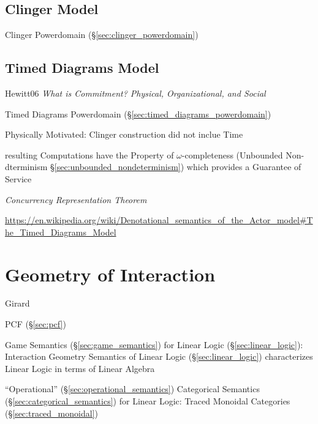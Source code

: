 \subsection{Clinger Model}\label{sec:clinger_model}

Clinger Powerdomain (\S\ref{sec:clinger_powerdomain})



\subsection{Timed Diagrams Model}\label{sec:timed_diagrams}

Hewitt06 \emph{What is Commitment? Physical, Organizational, and
  Social}

Timed Diagrams Powerdomain (\S\ref{sec:timed_diagrams_powerdomain})

Physically Motivated: Clinger construction did not inclue Time

resulting Computations have the Property of $\omega$-completeness
(Unbounded Non-dterminism \S\ref{sec:unbounded_nondeterminism}) which
provides a Guarantee of Service %


\emph{Concurrency Representation Theorem} %

\url{https://en.wikipedia.org/wiki/Denotational_semantics_of_the_Actor_model#The_Timed_Diagrams_Model}


\endgroup



\section{Geometry of Interaction}\label{sec:interaction_geometry}

Girard

PCF (\S\ref{sec:pcf})

Game Semantics (\S\ref{sec:game_semantics}) for Linear Logic
(\S\ref{sec:linear_logic}): Interaction Geometry Semantics of Linear
Logic (\S\ref{sec:linear_logic}) characterizes Linear Logic in terms
of Linear Algebra


``Operational'' (\S\ref{sec:operational_semantics}) Categorical
Semantics (\S\ref{sec:categorical_semantics}) for Linear Logic: Traced
Monoidal Categories (\S\ref{sec:traced_monoidal})

